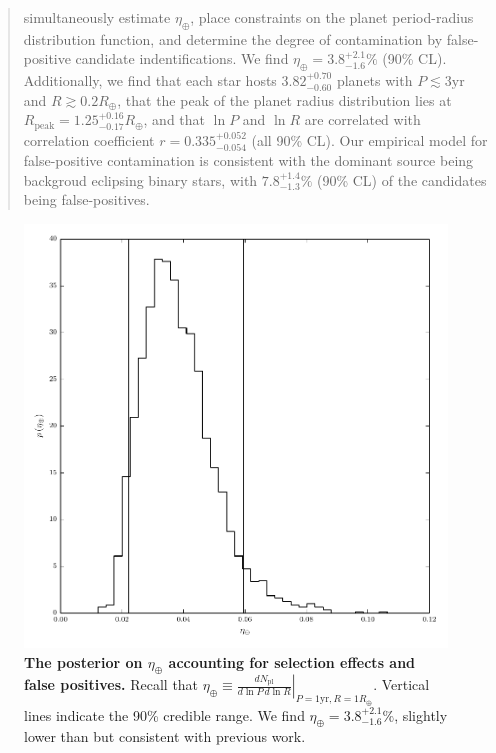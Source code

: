 \documentclass{nature}
\newcommand{\etaearth}{\eta_\oplus}
\newcommand{\Rpeak}{R_\mathrm{peak}}
\newcommand{\REarth}{R_\oplus}
\begin{document}
\begin{abstract}
  simultaneously estimate $\etaearth$, place constraints on the planet
  period-radius distribution function, and determine the degree of
  contamination by false-positive candidate indentifications.  We find
  $\etaearth = 3.8^{+2.1}_{-1.6}\%$ (90\% CL).  Additionally, we find
  that each star hosts $3.82_{-0.60}^{+0.70}$ planets with $P \lesssim
  3 \mathrm{yr}$ and $R \gtrsim 0.2 \REarth$, that the peak of the
  planet radius distribution lies at $\Rpeak = 1.25_{-0.17}^{+0.16}
  \REarth$, and that $\ln P$ and $\ln R$ are correlated with
  correlation coefficient $r = 0.335_{-0.054}^{+0.052}$ (all 90\% CL).
  Our empirical model for false-positive contamination is consistent
  with the dominant source being backgroud eclipsing binary
  stars\cite{2013ApJ...766...81F}, with $7.8_{-1.3}^{+1.4}\%$ (90\%
  CL) of the candidates being false-positives.
\end{abstract}

\begin{figure}
  \includegraphics[width=\columnwidth]{eta-earth}
  \caption{\label{fig:eta-earth} \textbf{The posterior on $\etaearth$
      accounting for selection effects and false positives.}  Recall
    that $\etaearth \equiv \left. \frac{dN_\mathrm{pl}}{d\ln P \,d \ln
      R} \right|_{P = 1\mathrm{yr}, R=1\REarth}$.  Vertical lines
    indicate the 90\% credible range.  We find $\etaearth =
    3.8^{+2.1}_{-1.6}\%$, slightly lower than but consistent with
    previous work\cite{2013PNAS..11019273P}.}
\end{figure}
\end{document}
